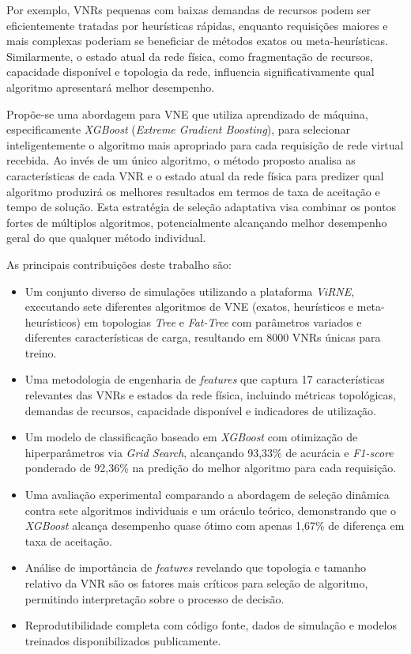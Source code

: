 \documentclass[conference]{IEEEtran}
\begin{document}
Por exemplo, VNRs pequenas com baixas demandas de recursos podem ser eficientemente tratadas por heurísticas rápidas, enquanto requisições maiores e mais complexas poderiam se beneficiar de métodos exatos ou meta-heurísticas. Similarmente, o estado atual da rede física, como fragmentação de recursos, capacidade disponível e topologia da rede, influencia significativamente qual algoritmo apresentará melhor desempenho.

Propõe-se uma abordagem para VNE que utiliza aprendizado de máquina, especificamente \textit{XGBoost} (\textit{Extreme Gradient Boosting}), para selecionar inteligentemente o algoritmo mais apropriado para cada requisição de rede virtual recebida. Ao invés de um único algoritmo, o método proposto analisa as características de cada VNR e o estado atual da rede física para predizer qual algoritmo produzirá os melhores resultados em termos de taxa de aceitação e tempo de solução. Esta estratégia de seleção adaptativa visa combinar os pontos fortes de múltiplos algoritmos, potencialmente alcançando melhor desempenho geral do que qualquer método individual.

As principais contribuições deste trabalho são:

\begin{itemize}
    \item Um conjunto diverso de simulações utilizando a plataforma \textit{ViRNE}, executando sete diferentes algoritmos de VNE (exatos, heurísticos e meta-heurísticos) em topologias \textit{Tree} e \textit{Fat-Tree} com parâmetros variados e diferentes características de carga, resultando em 8000 VNRs únicas para treino.

    \item Uma metodologia de engenharia de \textit{features} que captura 17 características relevantes das VNRs e estados da rede física, incluindo métricas topológicas, demandas de recursos, capacidade disponível e indicadores de utilização.

    \item Um modelo de classificação baseado em \textit{XGBoost} com otimização de hiperparâmetros via \textit{Grid Search}, alcançando 93,33\% de acurácia e \textit{F1-score} ponderado de 92,36\% na predição do melhor algoritmo para cada requisição.

    \item Uma avaliação experimental comparando a abordagem de seleção dinâmica contra sete algoritmos individuais e um oráculo teórico, demonstrando que o \textit{XGBoost} alcança desempenho quase ótimo com apenas 1,67\% de diferença em taxa de aceitação.

    \item Análise de importância de \textit{features} revelando que topologia e tamanho relativo da VNR são os fatores mais críticos para seleção de algoritmo, permitindo interpretação sobre o processo de decisão.

    \item Reprodutibilidade completa com código fonte, dados de simulação e modelos treinados disponibilizados publicamente.
\end{itemize}
\end{document}
